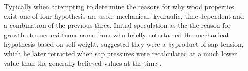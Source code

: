 Typically when attempting to determine the reasons for why wood properties exist
one of four hypothesis are used; mechanical, hydraulic, time dependent and a
combination of the previous three. Initial speculation as the the reason for
growth stresses existence came from \cite{MARTLEY01011928} who briefly entertained the
mechanical hypothesis based on self weight. \cite{jacobs1945l} suggested they were a
byproduct of sap tension, which he later retracted when sap
pressures were recalculated at a much lower value than the generally believed
values at the time \cite{jacobs1965l}. 